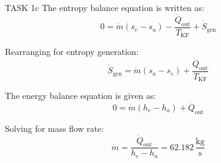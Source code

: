 TASK 1c  
The entropy balance equation is written as:  
\[
0 = \dot{m} (s_e - s_a) - \frac{\dot{Q}_{\text{out}}}{T_{\text{KF}}} + \dot{S}_{\text{gen}}
\]  

Rearranging for entropy generation:  
\[
\dot{S}_{\text{gen}} = \dot{m} (s_a - s_e) + \frac{\dot{Q}_{\text{out}}}{T_{\text{KF}}}
\]  

The energy balance equation is given as:  
\[
0 = \dot{m} (h_e - h_a) + \dot{Q}_{\text{out}}
\]  

Solving for mass flow rate:  
\[
\dot{m} = \frac{\dot{Q}_{\text{out}}}{h_e - h_a} = 62.182 \, \frac{\text{kg}}{\text{s}}
\]